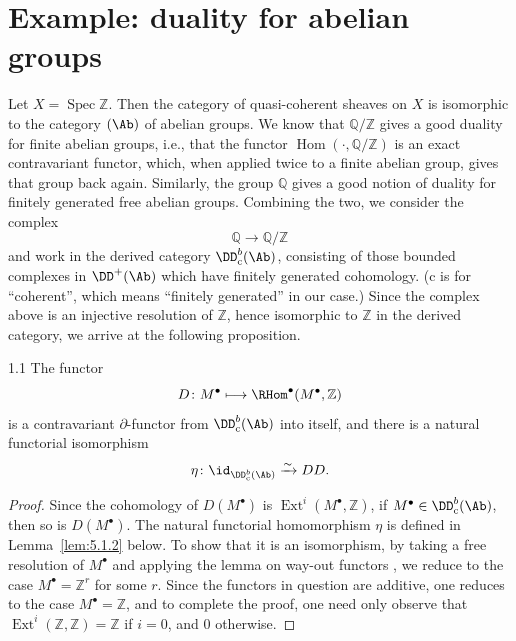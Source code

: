\section{Example: duality for abelian groups}\label{sec:5.1}

Let $X=\operatorname{Spec}\mathbb{Z}$. Then the category of quasi-coherent sheaves on $X$ is isomorphic to the category $(\Ab)$ of abelian groups. We know that $\mathbb{Q}/\mathbb{Z}$ gives a good duality for finite abelian groups, i.e., that the functor $\operatorname{Hom}(\cdot,\mathbb{Q}/\mathbb{Z})$ is an exact contravariant functor, which, when applied twice to a finite abelian group, gives that group back again. Similarly, the group $\mathbb{Q}$ gives a good notion of duality for finitely generated free abelian groups. Combining the two, we consider the complex
\[
\mathbb{Q}\longrightarrow \mathbb{Q}/\mathbb{Z}
\]
and work in the derived category $\DD_{\mathrm{c}}^{b}(\Ab)$, consisting of those bounded complexes in $\DD^{+}(\Ab)$ which have finitely generated cohomology. ($\mathrm{c}$ is for ``coherent'', which means ``finitely generated'' in our case.) Since the complex above is an injective resolution of $\mathbb{Z}$, hence isomorphic to $\mathbb{Z}$ in the derived category, we arrive at the following proposition.

\begin{bookproposition}{1.1}\label{prop:5.1.1}
The functor
\[
D\colon M^{\bullet}\longmapsto \RHom^\bullet(M^{\bullet},\mathbb{Z})
\]
is a contravariant $\partial$-functor from $\DD_{\mathrm{c}}^{b}(\Ab)$ into itself, and there is a natural functorial isomorphism
\[
\eta\colon \id_{\DD_{\mathrm{c}}^{b}(\Ab)}\xrightarrow{\sim} DD.
\]
\end{bookproposition}

\begin{proof}
Since the cohomology of $D(M^{\bullet})$ is $\operatorname{Ext}^{i}(M^{\bullet},\mathbb{Z})$, if $M^{\bullet}\in\DD^{b}_{\mathrm{c}}(\Ab)$, then so is $D(M^{\bullet})$. The natural functorial homomorphism $\eta$ is defined in Lemma~\ref{lem:5.1.2} below. To show that it is an isomorphism, by taking a free resolution of $M^{\bullet}$ and applying the lemma on way-out functors , we reduce to the case $M^{\bullet}=\mathbb{Z}^{r}$ for some $r$. Since the functors in question are additive, one reduces to the case $M^{\bullet}=\mathbb{Z}$, and to complete the proof, one need only observe that $\operatorname{Ext}^{i}(\mathbb{Z},\mathbb{Z})=\mathbb{Z}$ if $i=0$, and $0$ otherwise.
\end{proof}

